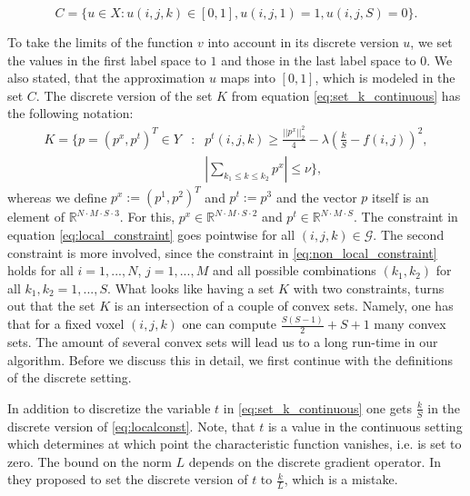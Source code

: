         \begin{equation}
            C = \{ u \in X: u(i,j,k) \in [0,1], u(i, j, 1) = 1, u(i, j, S) = 0 \}.
        \end{equation}

    To take the limits of the function $v$ into account in its discrete version $u$, we set the values in the first label space to $1$ and those in the last label space to $0$. We also stated, that the approximation $u$ maps into $[0, 1]$, which is modeled in the set $C$.
    The discrete version of the set $K$ from equation \ref{eq:set_k_continuous} has the following notation:
        \begin{eqnarray}
            K = \{ p = (p^{x}, p^{t})^{T} \in Y &:& p^{t}(i,j,k) \ge \frac{||p^{x}||_{2}^{2}}{4} - \lambda(\frac{k}{S} - f(i,j))^{2}, \label{eq:local_constraint} \\
            &&\left| \sum_{k_{1} \le k \le k_{2}} p^{x} \right| \le \nu \}, \label{eq:non_local_constraint}
        \end{eqnarray}
    whereas we define $p^{x} := (p^{1}, p^{2})^{T}$ and $p^{t} := p^{3}$ and the vector $p$ itself is an element of $\mathbb{R}^{N \cdot M \cdot S \cdot 3}$. For this, $p^{x} \in \mathbb{R}^{N \cdot M \cdot S \cdot 2}$ and $p^{t} \in \mathbb{R}^{N \cdot M \cdot S}$. The constraint in equation \ref{eq:local_constraint} goes pointwise for all $(i, j, k) \in \mathcal{G}$. The second constraint is more involved, since the constraint in \ref{eq:non_local_constraint} holds for all $i = 1, ..., N$, $j = 1, ..., M$ and all possible combinations $(k_{1}, k_{2})$ for all $k_{1}, k_{2} = 1, ..., S$. What looks like having a set $K$ with two constraints, turns out that the set $K$ is an intersection of a couple of convex sets. Namely, one has that for a fixed voxel $(i, j, k)$ one can compute $\frac{S (S - 1)}{2} + S + 1$ many convex sets. The amount of several convex sets will lead us to a long run-time in our algorithm. Before we discuss this in detail, we first continue with the definitions of the discrete setting.

    \begin{remark}
        In addition to discretize the variable $t$ in \ref{eq:set_k_continuous} one gets $\frac{k}{S}$ in the discrete version of \ref{eq:localconst}. Note, that $t$ is a value in the continuous setting which determines at which point the characteristic function vanishes, i.e. is set to zero. The bound on the norm $L$ depends on the discrete gradient operator. In \cite{Pock-et-al-iccv09} they proposed to set the discrete version of $t$ to $\frac{k}{L}$, which is a mistake.
    \end{remark}

